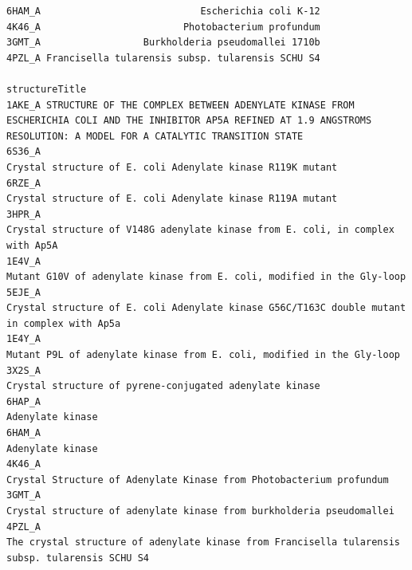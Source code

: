 \documentclass[
  letterpaper,
  DIV=11,
  numbers=noendperiod]{scrartcl}
\begin{document}
\begin{verbatim}
6HAM_A                            Escherichia coli K-12
4K46_A                         Photobacterium profundum
3GMT_A                  Burkholderia pseudomallei 1710b
4PZL_A Francisella tularensis subsp. tularensis SCHU S4
                                                                                                                                                                     structureTitle
1AKE_A STRUCTURE OF THE COMPLEX BETWEEN ADENYLATE KINASE FROM ESCHERICHIA COLI AND THE INHIBITOR AP5A REFINED AT 1.9 ANGSTROMS RESOLUTION: A MODEL FOR A CATALYTIC TRANSITION STATE
6S36_A                                                                                                                   Crystal structure of E. coli Adenylate kinase R119K mutant
6RZE_A                                                                                                                   Crystal structure of E. coli Adenylate kinase R119A mutant
3HPR_A                                                                                               Crystal structure of V148G adenylate kinase from E. coli, in complex with Ap5A
1E4V_A                                                                                                       Mutant G10V of adenylate kinase from E. coli, modified in the Gly-loop
5EJE_A                                                                                  Crystal structure of E. coli Adenylate kinase G56C/T163C double mutant in complex with Ap5a
1E4Y_A                                                                                                        Mutant P9L of adenylate kinase from E. coli, modified in the Gly-loop
3X2S_A                                                                                                                      Crystal structure of pyrene-conjugated adenylate kinase
6HAP_A                                                                                                                                                             Adenylate kinase
6HAM_A                                                                                                                                                             Adenylate kinase
4K46_A                                                                                                          Crystal Structure of Adenylate Kinase from Photobacterium profundum
3GMT_A                                                                                                         Crystal structure of adenylate kinase from burkholderia pseudomallei
4PZL_A                                                                              The crystal structure of adenylate kinase from Francisella tularensis subsp. tularensis SCHU S4

\end{verbatim}
\end{document}

